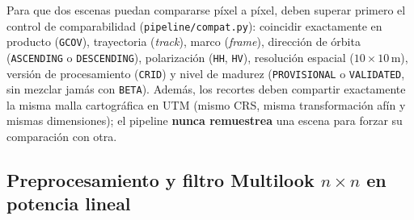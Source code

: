 \documentclass[11pt,a4paper]{article}
\newcommand{\src}[1]{\nolinkurl{#1}}
\newcommand{\unit}[1]{\mathrm{#1}}
\begin{document}
Para que dos escenas puedan compararse píxel a píxel, deben superar primero el control de comparabilidad
(\src{pipeline/compat.py}): coincidir exactamente en producto (\texttt{GCOV}), trayectoria (\emph{track}), marco
(\emph{frame}), dirección de órbita (\texttt{ASCENDING} o \texttt{DESCENDING}), polarización (\texttt{HH},
\texttt{HV}), resolución espacial ($10\times 10\,\unit{m}$), versión de procesamiento (\texttt{CRID}) y nivel de
madurez (\texttt{PROVISIONAL} o \texttt{VALIDATED}, sin mezclar jamás con \texttt{BETA}). Además, los recortes
deben compartir exactamente la misma malla cartográfica en UTM (mismo CRS, misma transformación afín y mismas
dimensiones); el pipeline \textbf{nunca remuestrea} una escena para forzar su comparación con otra.

\subsection{Preprocesamiento y filtro Multilook $n\times n$ en potencia lineal}
\label{subsec:cambio-multilook}
\end{document}
